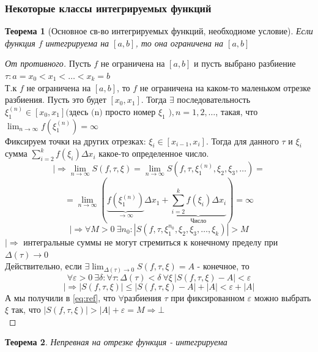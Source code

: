 \documentclass[a4paper]{article}
\newtheorem{theorem}{Теорема}
\theoremstyle{definition}
\newcommand\abs[1]{%
\mbox{$| #1 |$}}
\newcommand\InAll[0]{%
|\Rightarrow}
\numberwithin{theorem}{subsection}
\numberwithin{lemma}{subsection}
\numberwithin{definition}{subsection}
\numberwithin{comment*}{subsection}
\numberwithin{consequence}{subsection}
\numberwithin{property}{subsection}
\begin{document}
\subsubsection{Некоторые классы интегрируемых функций}
\begin{theorem}[Основное св-во интегрируемых функций, необходиоме условие]
 Если функция $f$ интегрируема на $[a,b]$, то она ограничена на $[a,b]$
\end{theorem}
\begin{proof}[От противного]
 Пусть $f$ не ограничена на $[a,b]$ и пусть выбрано разбиение $\tau: a = x_0<x_1< \dots < x_k = b$\\
 Т.к $f$ не ограничена на $[a,b]$, то $f$ не ограничена на каком-то маленьком отрезке разбиения. Пусть это будет $[x_0, x_1]$. Тогда $\exists{}$ последовательность $\xi_1^{(n)} \in [x_0,x_1]\text{(здесь (n) просто номер $\xi_1$ )}, n=1,2, \dots$, такая, что $\lim_{n \rightarrow \infty}{f(\xi_1^{(n)})} = \infty$\\
 Фиксируем точки на других отрезках: $\xi_i\in[x_{i-1}, x_{i}]$. Тогда для данного $\tau$ и $\xi_i$ сумма $\sum_{i =2}^{k}{f(\xi_i)\Delta x_i}$  какое-то определенное число.\\
 $$ \InAll \lim_{n \rightarrow \infty}{S(f,\tau,\xi)} = \lim_{n \rightarrow \infty}{S(f,\tau, \xi_1^{(n)}, \xi_2, \xi_3, \dots )} = $$
 $$= \lim_{n \rightarrow \infty}{( \underbrace{f(\xi_1^{(n)})}_{\rightarrow \infty}\Delta x_1 + \underbrace{\sum_{i =2}^{k}{f(\xi_i)\Delta x_i} }_{\text{Число}})} = \infty$$
 \begin{equation}
  \InAll \forall{M} > 0\ \exists{n_0}: \abs{S(f,\tau, \xi_1^{n_0}, \xi_2, \xi_3, \dots, \xi_k ) }>M \label{eq:ref}
 \end{equation}
 $\InAll $ интегральные суммы не могут стремиться к конечному пределу при $\Delta(\tau) \rightarrow 0$\\
 Действительно, если $\exists{\lim_{\Delta(\tau) \rightarrow 0}{S(f,\tau, \xi)}} = A$ - конечное, то
 $$\forall{\varepsilon}>0 \ \exists{\delta}: \forall{\tau}: \Delta (\tau) < \delta\ \forall{\xi}\ \abs{S(f, \tau, \xi) - A} <\varepsilon $$
 $$\InAll \abs{S(f,\tau, \xi)} \leq \abs{S(f,\tau, \xi) - A} + \abs{A} < \varepsilon + \abs{A} $$
 А мы получили в \ref{eq:ref}, что $\forall$разбиения $\tau$ при фиксированном $\varepsilon$ можно выбрать $\xi$ так, что $\abs{S(f,\tau, \xi)}>\abs{A} + \varepsilon= M \Rightarrow \bot$\\
\end{proof}
\begin{theorem}
 Непревная на отрезке функция - интегрируема
\end{theorem}
\end{document}
